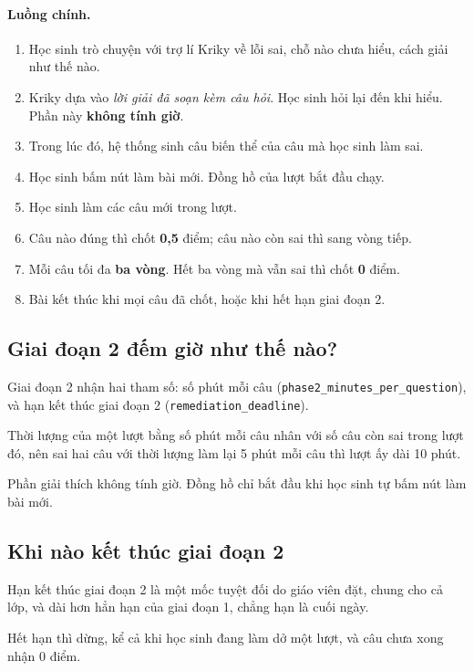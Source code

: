 \paragraph{Luồng chính.}
\begin{enumerate}
  \item Học sinh trò chuyện với trợ lí Kriky về lỗi sai, chỗ nào chưa hiểu, cách giải như thế nào. 
  \item Kriky dựa vào \emph{lời giải đã soạn kèm câu hỏi}. Học sinh hỏi lại đến khi hiểu. Phần này \textbf{không tính giờ}.
  \item Trong lúc đó, hệ thống sinh câu biến thể của câu mà học sinh làm sai.
  \item Học sinh bấm nút làm bài mới. Đồng hồ của lượt bắt đầu chạy.
  \item Học sinh làm các câu mới trong lượt.
  \item Câu nào đúng thì chốt \textbf{0,5} điểm; câu nào còn sai thì sang vòng tiếp.
  \item Mỗi câu tối đa \textbf{ba vòng}. Hết ba vòng mà vẫn sai thì chốt \textbf{0} điểm.
  \item Bài kết thúc khi mọi câu đã chốt, hoặc khi hết hạn giai đoạn 2.
\end{enumerate}

\subsection{Giai đoạn 2 đếm giờ như thế nào?}
\label{sec:hai-dong-ho}

Giai đoạn 2 nhận hai tham số: số phút mỗi câu (\texttt{phase2\_minutes\_per\_question}), và hạn
kết thúc giai đoạn 2 (\texttt{remediation\_deadline}).

Thời lượng của một lượt bằng số phút mỗi câu nhân với số câu còn sai trong lượt đó, nên sai hai câu với 
thời lượng làm lại 5 phút mỗi câu thì lượt ấy dài 10 phút.

Phần giải thích không tính giờ. Đồng hồ chỉ bắt đầu khi học sinh tự bấm nút làm bài mới.

\subsection{Khi nào kết thúc giai đoạn 2}

Hạn kết thúc giai đoạn 2 là một mốc tuyệt đối do giáo viên đặt, chung cho cả lớp, và dài hơn hẳn hạn
của giai đoạn 1, chẳng hạn là cuối ngày.

Hết hạn thì dừng, kể cả khi học sinh đang làm dở một lượt, và câu chưa xong nhận 0 điểm. 

